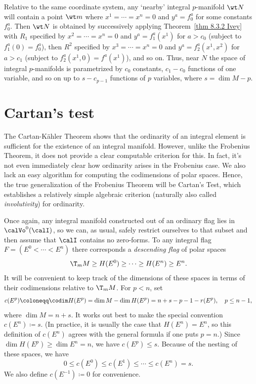 \begin{rem}
    Relative to the same coordinate system, any `nearby' integral $p$-manifold $\wt N$ will contain a point $\wt m$ where $x^1=\cdots=x^n=0$ and $y^a=f_0^a$ for some constants $f_0^a$. Then $\wt N$ is obtained by successively applying Theorem~\ref{thm 8.3.2 Ivey} with $R_1$ specified by $x^2=\cdots=x^n=0$ and $y^a=f_1^a(x^1)$ for $a>c_0$ (subject to $f_1^a(0)=f_0^a$), then $R^2$ specified by $x^3=\cdots=x^n=0$ and $y^a=f_2^a(x^1,x^2)$ for $a>c_1$ (subject to $f_2^a(x^1,0)=f^a(x^1)$), and so on. Thus, near $N$ the space of integral $p$-manifolds is parametrized by $c_0$ constants, $c_1-c_0$ functions of one variable, and so on up to $s-c_{p-1}$ functions of $p$ variables, where $s=\dim M-p$.
\end{rem}









\section{Cartan's test}


The Cartan-K\"ahler Theorem shows that the ordinarity of an integral element is sufficient for the existence of an integral manifold. However, unlike the Frobenius Theorem, it does not provide a clear computable criterion for this. In fact, it's not even immediately clear how ordinarity arises in the Frobenius case. We also lack an easy algorithm for computing the codimensions of polar spaces. Hence, the true generalization of the Frobenius Theorem will be Cartan's Test, which establishes a relatively simple algebraic criterion (naturally also called \emph{involutivity}) for ordinarity.

Once again, any integral manifold constructed out of an ordinary flag lies in $\calVo^0(\calI)$, so we can, as usual, safely restrict ourselves to that subset and then assume that $\calI$ contains no zero-forms. To any integral flag $F=(E^0<\cdots<E^n)$ there corresponds a \emph{descending flag} of polar spaces
\[\T_m M\geq H(E^0)\geq \cdots \geq H(E^n)\geq E^n.\]
It will be convenient to keep track of the dimensions of these spaces in terms of their codimensions relative to $\T_m M$. For $p<n$, set 
\[c(E^p)\coloneqq \codim H(E^p)=\dim M-\dim H(E^p)=n+s-p-1-r(E^p),\quad p\leq n-1,\]
where $\dim M=n+s$. It works out best to make the special convention $c(E^n)\coloneqq s$. (In practice, it is usually the case that $H(E^n)=E^n$, so this definition of $c(E^n)$ agrees with the general formula if one puts $p=n$.) Since $\dim H(E^p)\geq \dim E^n=n$, we have $c(E^p)\leq s$. Because of the nesting of these spaces, we have 
\[0\leq c(E^0)\leq c(E^1)\leq\cdots \leq c(E^n)= s.\]
We also define $c(E^{-1})\coloneqq 0$ for convenience. 

